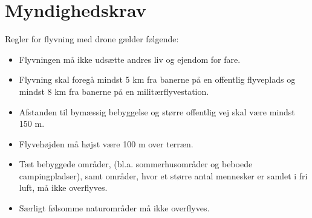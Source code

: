 \documentclass[Main]{subfiles}
\begin{document}
\chapter{Myndighedskrav}
Regler for flyvning med drone gælder følgende:

\begin{itemize}
\item Flyvningen må ikke udsætte andres liv og ejendom for fare\cite[s. 1]{Lov1}.
\item Flyvning skal foregå mindst 5 km fra banerne på en offentlig flyveplads og mindst 8 km fra banerne på en militærflyvestation\cite[s. 1]{Lov1}.
\item Afstanden til bymæssig bebyggelse og større offentlig vej skal være mindst 150 m\cite[s. 1]{Lov1}.
\item Flyvehøjden må højst være 100 m over terræn\cite[s. 2]{Lov1}.
\item Tæt bebyggede områder, (bl.a. sommerhusområder og beboede campingpladser), samt områder, hvor et større antal mennesker er samlet i fri luft, må ikke overflyves\cite[s. 2]{Lov1}.
\item Særligt følsomme naturområder må ikke overflyves\cite[s. 2]{Lov1}.
\end{itemize} 
\end{document}
